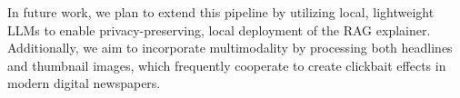 \documentclass[conference]{IEEEtran}
\begin{document}
In future work, we plan to extend this pipeline by utilizing local, lightweight LLMs to enable privacy-preserving, local deployment of the RAG explainer. Additionally, we aim to incorporate multimodality by processing both headlines and thumbnail images, which frequently cooperate to create clickbait effects in modern digital newspapers.



\end{document}

